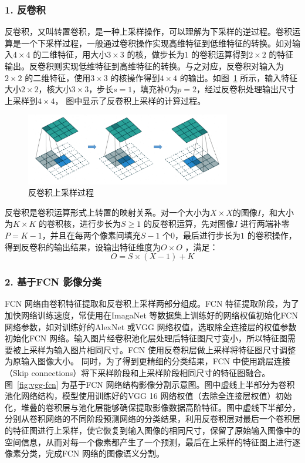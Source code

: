 \subsubsection*{1. 反卷积}
\label{subsec:chap02-2-2-1}
反卷积，又叫转置卷积，是一种上采样操作，可以理解为下采样的逆过程。卷积运算是一个下采样过程，一般通过卷积操作实现高维特征到低维特征的转换。如对输入$4\times 4$ 的二维特征，用大小$3\times 3$ 的核，做步长为$1$ 的卷积运算得到$2\times 2$ 的特征输出。反卷积则实现低维特征到高维特征的转换。与之对应，反卷积对输入为$2\times 2$ 的二维特征，使用$3\times 3$ 的核操作得到$4\times 4$ 的输出。如图~\ref{fig:deconv} 所示，输入特征大小$2\times 2$，核大小$3\times 3$，步长$s=1$，填充补0为$p=2$，经过反卷积处理输出尺寸上采样到$4\times 4$， 图中显示了反卷积上采样的计算过程。

\begin{figure}[htb]
  \centering
  \includegraphics[width=0.8\textwidth]{figures/deconv}
  \caption{反卷积上采样过程}\label{fig:deconv}
\end{figure}

反卷积是卷积运算形式上转置的映射关系。对一个大小为$X\times X$的图像$\textit{I}$，和大小为$K\times K$ 的卷积核，进行步长为$S \geq 1$ 的反卷积运算，先对图像$\textit{I}$ 进行两端补零$P=K-1$，并且在每两个像素间填充$S-1$ 个$0$，最后进行步长为$1$ 的卷积操作，得到反卷积的输出结果，设输出特征维度为$O \times O$ ，满足：
\begin{equation}
  \label{eq:2-20}
  O = S \times (X - 1) + K
\end{equation}

\subsubsection*{2. 基于FCN 影像分类}
\label{subsec:chap02-2-2-2}
FCN 网络由卷积特征提取和反卷积上采样两部分组成。FCN 特征提取阶段，为了加快网络训练速度，常使用在ImagaNet 等数据集上训练好的网络权值初始化FCN 网络参数，如对训练好的AlexNet\cite{krizhevsky2012imagenet} 或VGG\cite{simonyan2014very} 网络权值，选取除全连接层的权值参数初始化FCN 网络。输入图片经卷积池化层处理后特征图尺寸变小，所以特征图需要被上采样为输入图片相同尺寸。FCN 使用反卷积层做上采样将特征图尺寸调整为原输入图像大小。 同时，为了得到更精细的分类结果，FCN 中使用跳层连接（Skip connections）将下采样阶段和上采样阶段相同尺寸的特征图融合。图~\ref{fig:vgg-fcn} 为基于FCN 网络结构影像分割示意图。图中虚线上半部分为卷积池化网络结构，模型使用训练好的VGG 16 网络权值（去除全连接层权值）初始化，堆叠的卷积层与池化层能够确保提取影像数据高阶特征。图中虚线下半部分，分别从卷积网络的不同阶段预测网络的分类结果，利用反卷积层对最后一个卷积层的特征图进行上采样，使它恢复到输入图像的相同尺寸，保留了原始输入图像中的空间信息，从而对每一个像素都产生了一个预测，最后在上采样的特征图上进行逐像素分类，完成FCN 网络的图像语义分割。

